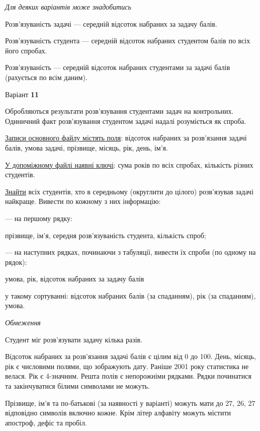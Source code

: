 \documentclass[11pt, ukrainian]{article}
\begin{document}
\bigskip\textit{Для деяких варіантів може знадобитись}

Розв'язуваність задачі --- середній відсоток набраних за задачу балів.

Розв'язуваність студента --- середній відсоток набраних студентом балів по всіх його спробах.

Розв'язуваність --- середній відсоток набраних студентами за задачі балів (рахується по всім даним).


\par
\newpage
{\center Варіант  \No \textbf { 11 }\par}
\bigskip
Обробляються результати розв’язування студентами задач на контрольних.
Одиничний факт роз\-в’я\-зу\-вання студентом задачі надалі розуміється як спроба.

\underline{Записи основного файлу містять поля}: відсоток набраних за розв’язання задачі балів, умова задачі, прізвище, місяць, рік, день, ім’я.

\underline{У допоміжному файлі наявні ключі}: сума років по всіх спробах, кількість різних студентів.

\underline{Знайти} всіх студентів, хто в середньому (округлити до цілого) розв’язував задачі найкраще. Вивести по кожному з них інформацію:\par
{\noindent}--- на першому рядку:\par
прізвище, ім’я, середня розв’язуваність студента, кількість спроб;

{\noindent}--- на наступних рядках, починаючи з табуляції, вивести їх спроби (по одному на рядок):\par
умова, рік, відсоток набраних за задачу балів

{\noindent}у такому сортуванні: відсоток набраних балів (за спаданням), рік (за спаданням), умова.


\bigskip\textit{Обмеження}

Студент міг розв’язувати задачу кілька разів.

Відсоток набраних за розв’язання задачі балів є цілим від 0 до 100.
День, місяць, рік є числовими полями, що зображують дату.
Раніше 2001 року статистика не велася. Рік є 4-значним.
Решта полів є непорожніми рядками.
Рядки починатися та закінчуватися білими символами не можуть.

Прізвище, ім’я та по-батькові (за наявності у варіанті) можуть мати до 27, 26, 27 відповідно символів включно кожне. 
Крім літер алфавіту можуть містити апостроф, дефіс та пробіл.
\end{document}
